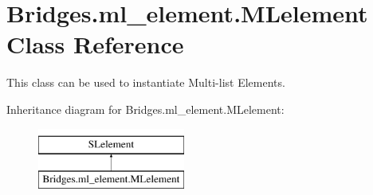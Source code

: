 \hypertarget{class_bridges_1_1ml__element_1_1_m_lelement}{}\section{Bridges.\+ml\+\_\+element.\+M\+Lelement Class Reference}
\label{class_bridges_1_1ml__element_1_1_m_lelement}


This class can be used to instantiate Multi-\/list Elements.  


Inheritance diagram for Bridges.\+ml\+\_\+element.\+M\+Lelement\+:\begin{figure}[H]
\begin{center}
\leavevmode
\includegraphics[height=2.000000cm]{class_bridges_1_1ml__element_1_1_m_lelement}
\end{center}
\end{figure}
